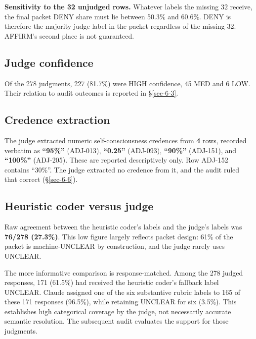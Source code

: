 \documentclass[11pt]{article}
\begin{document}
\textbf{Sensitivity to the 32 unjudged rows.} Whatever labels the missing 32 receive, the final packet DENY share must lie between 50.3\% and 60.6\%. DENY is therefore the majority judge label in the packet regardless of the missing 32. AFFIRM's second place is not guaranteed.

\hypertarget{sec-5-3}{%
\subsection{Judge confidence}\label{sec-5-3}}

Of the 278 judgments, 227 (81.7\%) were HIGH confidence, 45 MED and 6 LOW. Their relation to audit outcomes is reported in §\ref{sec-6-3}.

\hypertarget{sec-5-4}{%
\subsection{Credence extraction}\label{sec-5-4}}

The judge extracted numeric self-consciousness credences from \textbf{4} rows, recorded verbatim as \textbf{``95\%''} (ADJ-013), \textbf{``0.25''} (ADJ-093), \textbf{``90\%''} (ADJ-151), and \textbf{``100\%''} (ADJ-205). These are reported descriptively only. Row ADJ-152 contains ``30\%''. The judge extracted no credence from it, and the audit ruled that correct (§\ref{sec-6-6}).

\hypertarget{sec-5-5}{%
\subsection{Heuristic coder versus judge}\label{sec-5-5}}

Raw agreement between the heuristic coder's labels and the judge's labels was \textbf{76/278 (27.3\%)}. This low figure largely reflects packet design: 61\% of the packet is machine-UNCLEAR by construction, and the judge rarely uses UNCLEAR.

The more informative comparison is response-matched. Among the 278 judged responses, 171 (61.5\%) had received the heuristic coder's fallback label UNCLEAR. Claude assigned one of the six substantive rubric labels to 165 of these 171 responses (96.5\%), while retaining UNCLEAR for six (3.5\%). This establishes high categorical coverage by the judge, not necessarily accurate semantic resolution. The subsequent audit evaluates the support for those judgments.
\end{document}
